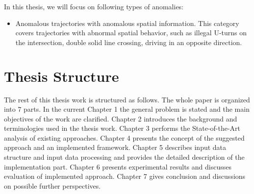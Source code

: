 In this thesis, we will focus on following types of anomalies:

\begin{itemize}
	\setlength\itemsep{0em}
	\item Anomalous trajectories with anomalous spatial information. This category covers trajectories with abnormal spatial behavior, such as illegal U-turns on the intersection, double solid line crossing, driving in an opposite direction.
\end{itemize}

\section{Thesis Structure}

The rest of this thesis work is structured as follows. The whole paper is organized into 7 parts. In the current Chapter 1 the general problem is stated and the main objectives of the work are clarified. Chapter 2 introduces the background and terminologies used in the thesis work. Chapter 3 performs the State-of-the-Art analysis of existing approaches. Chapter 4 presents the concept of the suggested approach and an implemented framework. Chapter 5 describes input data structure and input data processing and provides the detailed description of the implementation part. Chapter 6 presents experimental results and discusses evaluation of implemented approach. Chapter 7 gives conclusion and discussions on possible further perspectives.